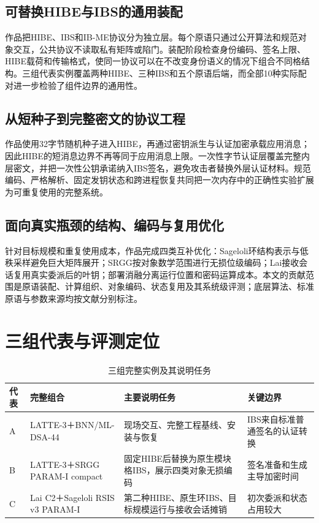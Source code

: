 \documentclass[UTF8,a4paper,12pt,oneside,openany,fontset=fandol]{ctexrep}
\begin{document}
\subsection{可替换HIBE与IBS的通用装配}
作品把HIBE、IBS和IB-ME协议分为独立层。每个原语只通过公开算法和规范对象交互，公共协议不读取私有矩阵或陷门。装配阶段检查身份编码、签名上限、HIBE载荷和传输格式，使同一协议可以在不改变身份语义的情况下组合不同格结构。三组代表实例覆盖两种HIBE、三种IBS和五个原语后端，而全部10种实际配对进一步检验了组件边界的通用性。

\subsection{从短种子到完整密文的协议工程}
作品使用32字节随机种子进入HIBE，再通过密钥派生与认证加密承载应用消息；因此HIBE的短消息边界不再等同于应用消息上限。一次性字节认证层覆盖完整内层密文，并把一次性公钥承诺纳入IBS签名，避免攻击者替换外层认证材料。规范编码、严格解析、固定发钥状态和跨进程恢复共同把一次内存中的正确性实验扩展为可重复使用的完整系统。

\subsection{面向真实瓶颈的结构、编码与复用优化}
针对目标规模和重复使用成本，作品完成四类互补优化：Sageloli环结构表示与低秩采样避免巨大矩阵展开；SRGG按对象数学范围进行无损位级编码；Lai接收会话复用真实委派后的叶钥；部署消融分离运行位置和密码运算成本。本文的贡献范围是原语装配、计算组织、对象编码、状态复用及其系统级评测；底层算法、标准原语与参数来源均按文献分别标注。

\section{三组代表与评测定位}
\begin{table}[htbp]
\centering
\small
\caption{三组完整实例及其说明任务}
\label{tab:three-representatives}
\begin{tabularx}{\textwidth}{@{}>{\raggedright\arraybackslash}p{}>{\raggedright\arraybackslash}p{}>{\raggedright\arraybackslash}X>{\raggedright\arraybackslash}p{}@{}}
\toprule
\rowcolor{black!8} 代表 & 完整组合 & 主要说明任务 & 关键边界 \\
\midrule
A & LATTE-3＋BNN/ML-DSA-44 & 现场交互、完整工程基线、安装与恢复 & IBS来自标准普通签名的认证转换 \\
B & LATTE-3＋SRGG PARAM-I compact & 固定HIBE后替换为原生模块格IBS，展示四类对象无损编码 & 签名准备和生成主导加密时间 \\
C & Lai C2＋Sageloli RSIS v3 PARAM-I & 第二种HIBE、原生环IBS、目标规模运行与接收会话摊销 & 初次委派和状态占用较大 \\
\bottomrule
\end{tabularx}
\end{table}
\end{document}
